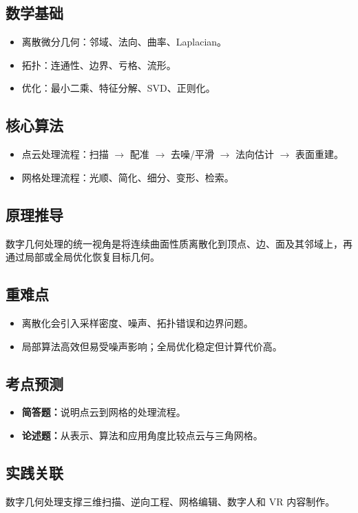 \documentclass[UTF8,fontset=fandol,11pt]{ctexart}
\newcommand{\exam}[1]{\textcolor{blue!55!black}{\textbf{#1}}}
\begin{document}
\subsection{数学基础}
\begin{itemize}
  \item 离散微分几何：邻域、法向、曲率、Laplacian。
  \item 拓扑：连通性、边界、亏格、流形。
  \item 优化：最小二乘、特征分解、SVD、正则化。
\end{itemize}
\subsection{核心算法}
\begin{itemize}
  \item 点云处理流程：扫描 $\rightarrow$ 配准 $\rightarrow$ 去噪/平滑 $\rightarrow$ 法向估计 $\rightarrow$ 表面重建。
  \item 网格处理流程：光顺、简化、细分、变形、检索。
\end{itemize}
\subsection{原理推导}
数字几何处理的统一视角是将连续曲面性质离散化到顶点、边、面及其邻域上，再通过局部或全局优化恢复目标几何。
\subsection{重难点}
\begin{itemize}
  \item 离散化会引入采样密度、噪声、拓扑错误和边界问题。
  \item 局部算法高效但易受噪声影响；全局优化稳定但计算代价高。
\end{itemize}
\subsection{考点预测}
\begin{itemize}
  \item \exam{简答题：}说明点云到网格的处理流程。
  \item \exam{论述题：}从表示、算法和应用角度比较点云与三角网格。
\end{itemize}
\subsection{实践关联}
数字几何处理支撑三维扫描、逆向工程、网格编辑、数字人和 VR 内容制作。
\end{document}
